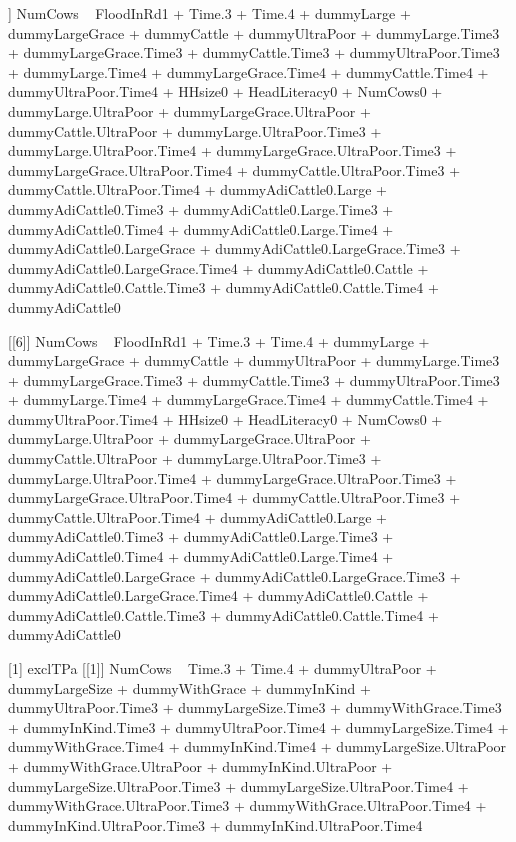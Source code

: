 \begin{Schunk}
\begin{Soutput}
[[5]]
NumCows ~ FloodInRd1 + Time.3 + Time.4 + dummyLarge + dummyLargeGrace + 
    dummyCattle + dummyUltraPoor + dummyLarge.Time3 + dummyLargeGrace.Time3 + 
    dummyCattle.Time3 + dummyUltraPoor.Time3 + dummyLarge.Time4 + 
    dummyLargeGrace.Time4 + dummyCattle.Time4 + dummyUltraPoor.Time4 + 
    HHsize0 + HeadLiteracy0 + NumCows0 + dummyLarge.UltraPoor + 
    dummyLargeGrace.UltraPoor + dummyCattle.UltraPoor + dummyLarge.UltraPoor.Time3 + 
    dummyLarge.UltraPoor.Time4 + dummyLargeGrace.UltraPoor.Time3 + 
    dummyLargeGrace.UltraPoor.Time4 + dummyCattle.UltraPoor.Time3 + 
    dummyCattle.UltraPoor.Time4 + dummyAdiCattle0.Large + dummyAdiCattle0.Time3 + 
    dummyAdiCattle0.Large.Time3 + dummyAdiCattle0.Time4 + dummyAdiCattle0.Large.Time4 + 
    dummyAdiCattle0.LargeGrace + dummyAdiCattle0.LargeGrace.Time3 + 
    dummyAdiCattle0.LargeGrace.Time4 + dummyAdiCattle0.Cattle + 
    dummyAdiCattle0.Cattle.Time3 + dummyAdiCattle0.Cattle.Time4 + 
    dummyAdiCattle0

[[6]]
NumCows ~ FloodInRd1 + Time.3 + Time.4 + dummyLarge + dummyLargeGrace + 
    dummyCattle + dummyUltraPoor + dummyLarge.Time3 + dummyLargeGrace.Time3 + 
    dummyCattle.Time3 + dummyUltraPoor.Time3 + dummyLarge.Time4 + 
    dummyLargeGrace.Time4 + dummyCattle.Time4 + dummyUltraPoor.Time4 + 
    HHsize0 + HeadLiteracy0 + NumCows0 + dummyLarge.UltraPoor + 
    dummyLargeGrace.UltraPoor + dummyCattle.UltraPoor + dummyLarge.UltraPoor.Time3 + 
    dummyLarge.UltraPoor.Time4 + dummyLargeGrace.UltraPoor.Time3 + 
    dummyLargeGrace.UltraPoor.Time4 + dummyCattle.UltraPoor.Time3 + 
    dummyCattle.UltraPoor.Time4 + dummyAdiCattle0.Large + dummyAdiCattle0.Time3 + 
    dummyAdiCattle0.Large.Time3 + dummyAdiCattle0.Time4 + dummyAdiCattle0.Large.Time4 + 
    dummyAdiCattle0.LargeGrace + dummyAdiCattle0.LargeGrace.Time3 + 
    dummyAdiCattle0.LargeGrace.Time4 + dummyAdiCattle0.Cattle + 
    dummyAdiCattle0.Cattle.Time3 + dummyAdiCattle0.Cattle.Time4 + 
    dummyAdiCattle0

[1] exclTPa
[[1]]
NumCows ~ Time.3 + Time.4 + dummyUltraPoor + dummyLargeSize + 
    dummyWithGrace + dummyInKind + dummyUltraPoor.Time3 + dummyLargeSize.Time3 + 
    dummyWithGrace.Time3 + dummyInKind.Time3 + dummyUltraPoor.Time4 + 
    dummyLargeSize.Time4 + dummyWithGrace.Time4 + dummyInKind.Time4 + 
    dummyLargeSize.UltraPoor + dummyWithGrace.UltraPoor + dummyInKind.UltraPoor + 
    dummyLargeSize.UltraPoor.Time3 + dummyLargeSize.UltraPoor.Time4 + 
    dummyWithGrace.UltraPoor.Time3 + dummyWithGrace.UltraPoor.Time4 + 
    dummyInKind.UltraPoor.Time3 + dummyInKind.UltraPoor.Time4


\end{Soutput}
\end{Schunk}
